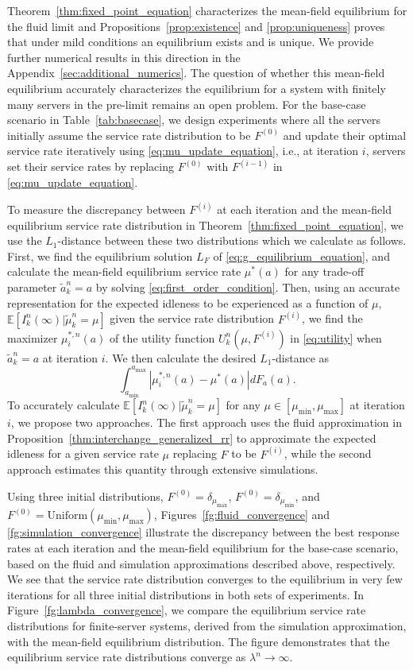 \documentclass[a4paper,11pt,twoside]{article}
\numberwithin{equation}{section}
\numberwithin{figure}{section}
\theoremstyle{plain}
\newcommand{\EE}{\mathbb{E}}
\newcommand{\1}{\mathbbm{1}}
\begin{document}
Theorem~\ref{thm:fixed_point_equation} characterizes the mean-field equilibrium for the fluid limit and Propositions~\ref{prop:existence} and \ref{prop:uniqueness} proves that under mild conditions an equilibrium exists and is unique. We provide further numerical results in this direction in the Appendix~\ref{sec:additional_numerics}. The question of whether this mean-field equilibrium  accurately characterizes the equilibrium for a system with finitely many servers in the pre-limit remains an open problem. For the base-case scenario in Table~\ref{tab:basecase}, we design experiments where all the servers initially assume the service rate distribution to be $F^{(0)}$ and update their optimal service rate iteratively using \eqref{eq:mu_update_equation}, i.e., at iteration $i$, servers set their service rates by replacing $F^{(0)}$ with $F^{(i-1)}$ in \eqref{eq:mu_update_equation}.

To measure the discrepancy between $F^{(i)}$ at each iteration and the mean-field equilibrium service rate distribution in Theorem~\ref{thm:fixed_point_equation}, we use the $L_1$-distance between these two distributions which we calculate as follows. First, we find the equilibrium solution $L_F$ of \eqref{eq:g_equilibrium_equation}, and calculate the mean-field equilibrium service rate $\mu^*(a)$ for any trade-off parameter $\tilde{a}_k^n=a$ by solving \eqref{eq:first_order_condition}. Then, using an accurate representation for the expected idleness to be experienced as a function of $\mu$, $\EE[I_k^n(\infty)|\tilde{\mu}_k^n=\mu]$ given the service rate distribution $F^{(i)}$, we find the maximizer $\mu_i^{*,n}(a)$ of the utility function $U_{k}^n(\mu,F^{(i)})$ in \eqref{eq:utility} when $\tilde{a}_k^n=a$ at iteration $i$. We then calculate the desired $L_1$-distance as
\[
\int_{a_{\min}}^{a_{\max}}|\mu_i^{*,n}(a)-\mu^*(a)|dF_a(a).
\]
To accurately calculate $\EE[I_k^n(\infty)|\tilde{\mu}_k^n=\mu]$ for any $\mu\in[\mu_{\min}, \mu_{\max}]$ at iteration $i$, we propose two approaches. The first approach uses the fluid approximation in Proposition~\ref{thm:interchange_generalized_rr} to approximate the expected idleness for a given service rate $\mu$ replacing $F$ to be $F^{(i)}$, while the second approach estimates this quantity through extensive simulations. 


Using three initial distributions, $F^{(0)} = \delta_{\mu_{\max}}$, $F^{(0)} = \delta_{\mu_{\min}}$, and $F^{(0)} = \text{Uniform}(\mu_{\min}, \mu_{\max})$, Figures~\ref{fg:fluid_convergence} and \ref{fg:simulation_convergence} illustrate the discrepancy between the best response rates at each iteration and the mean-field equilibrium for the base-case scenario, based on the fluid and simulation approximations described above, respectively. We see that the service rate distribution converges to the equilibrium in very few iterations for all three initial distributions in both sets of experiments. In Figure~\ref{fg:lambda_convergence}, we compare the equilibrium service rate distributions for finite-server systems, derived from the simulation approximation, with the mean-field equilibrium distribution. The figure demonstrates that the equilibrium service rate distributions converge as $\lambda^n \to \infty$.
\end{document}
